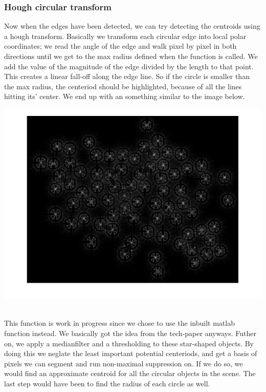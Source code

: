 \subsubsection{Hough circular transform}
Now when the edges have been detected, we can try detecting the centroids using a hough transform. Basically we transform each circular edge into local polar coordinates; we read the angle of the edge and walk pixel by pixel in both directions until we get to the max radius defined when the function is called. We add the value of the magnitude of the edge divided by the length to that point. This creates a linear fall-off along the edge line. So if the circle is smaller than the max radius, the centeriod should be highlighted, because of all the lines hitting its' center. We end up with an something  similar to the image below.\\
\centerline{\includegraphics[scale=0.3]{stars.png}}
\mbox{}\\
This function is work in progress since we chose to use the inbuilt matlab function instead. We basically got the idea from the tech-paper anyways. Futher on, we apply a medianfilter and a thresholding to these star-shaped objects. By doing this we neglate the least important potential centeriods, and get a basis of pixels we can segment and run non-maximal suppression on. If we do so, we would find an approximate centroid for all the circular objects in the scene. The last step would have been to find the radius of each circle as well. 
\\
